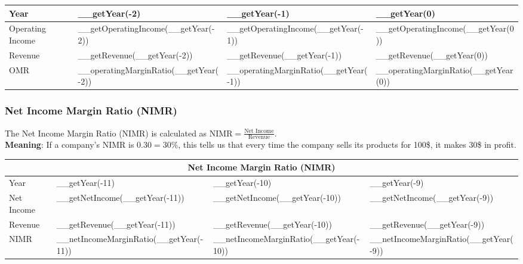 \begin{tabularx}{\textwidth}{|X|X|X|X|}
 \hline
 Year                      & __getYear(-2)                         & __getYear(-1)                         & __getYear(0)                         \\
 \hline
 Operating Income          & __getOperatingIncome(__getYear(-2))   & __getOperatingIncome(__getYear(-1))   & __getOperatingIncome(__getYear(0))   \\
 Revenue                   & __getRevenue(__getYear(-2))           & __getRevenue(__getYear(-1))           & __getRevenue(__getYear(0))           \\
 \rowcolor{lightgray} OMR  & __operatingMarginRatio(__getYear(-2)) & __operatingMarginRatio(__getYear(-1)) & __operatingMarginRatio(__getYear(0)) \\
 \hline
\end{tabularx}

\subsubsection{Net Income Margin Ratio (NIMR)}

The Net Income Margin Ratio (NIMR) is calculated as
$\text{NIMR} = \frac{\text{Net Income}}{\text{Revenue}}$.\\
\textbf{Meaning}: If a company's NIMR is $0.30 = 30\%$, this tells us that every
time the company sells its products for 100\$, it makes 30\$ in profit.\\

\begin{tabularx}{\textwidth}{|X|X|X|X|}
 \hline
 \multicolumn{4}{|c|}{Net Income Margin Ratio (NIMR)} \\
 \hline
 Year                       & __getYear(-11)                         & __getYear(-10)                         & __getYear(-9)                         \\
 \hline
 Net Income                 & __getNetIncome(__getYear(-11))         & __getNetIncome(__getYear(-10))         & __getNetIncome(__getYear(-9))         \\
 Revenue                    & __getRevenue(__getYear(-11))           & __getRevenue(__getYear(-10))           & __getRevenue(__getYear(-9))           \\
 \rowcolor{lightgray} NIMR  & __netIncomeMarginRatio(__getYear(-11)) & __netIncomeMarginRatio(__getYear(-10)) & __netIncomeMarginRatio(__getYear(-9)) \\
 \hline
\end{tabularx}\\

